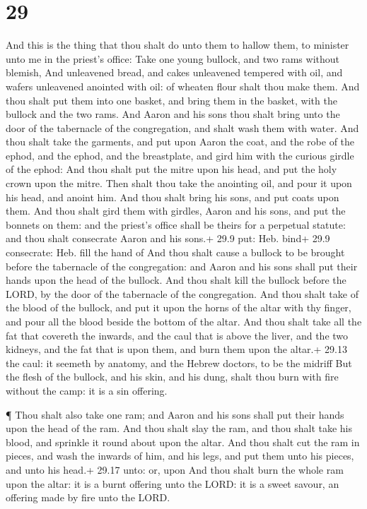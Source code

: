 \hypertarget{section-28}{%
\section{29}\label{section-28}}

 And this is the thing that thou shalt do unto them to
hallow them, to minister unto me in the priest's office: Take one young
bullock, and two rams without blemish,  And unleavened
bread, and cakes unleavened tempered with oil, and wafers unleavened
anointed with oil: of wheaten flour shalt thou make them. 
And thou shalt put them into one basket, and bring them in the basket,
with the bullock and the two rams.  And Aaron and his sons
thou shalt bring unto the door of the tabernacle of the congregation,
and shalt wash them with water.  And thou shalt take the
garments, and put upon Aaron the coat, and the robe of the ephod, and
the ephod, and the breastplate, and gird him with the curious girdle of
the ephod:  And thou shalt put the mitre upon his head, and
put the holy crown upon the mitre.  Then shalt thou take the
anointing oil, and pour it upon his head, and anoint him. 
And thou shalt bring his sons, and put coats upon them.  And
thou shalt gird them with girdles, Aaron and his sons, and put the
bonnets on them: and the priest's office shall be theirs for a perpetual
statute: and thou shalt consecrate Aaron and his sons.+ 29.9 put: Heb.
bind+ 29.9 consecrate: Heb. fill the hand of  And thou
shalt cause a bullock to be brought before the tabernacle of the
congregation: and Aaron and his sons shall put their hands upon the head
of the bullock.  And thou shalt kill the bullock before the
LORD, by the door of the tabernacle of the congregation. 
And thou shalt take of the blood of the bullock, and put it upon the
horns of the altar with thy finger, and pour all the blood beside the
bottom of the altar.  And thou shalt take all the fat that
covereth the inwards, and the caul that is above the liver, and the two
kidneys, and the fat that is upon them, and burn them upon the altar.+
29.13 the caul: it seemeth by anatomy, and the Hebrew doctors, to be the
midriff  But the flesh of the bullock, and his skin, and
his dung, shalt thou burn with fire without the camp: it is a sin
offering.

 ¶ Thou shalt also take one ram; and Aaron and his sons
shall put their hands upon the head of the ram.  And thou
shalt slay the ram, and thou shalt take his blood, and sprinkle it round
about upon the altar.  And thou shalt cut the ram in
pieces, and wash the inwards of him, and his legs, and put them unto his
pieces, and unto his head.+ 29.17 unto: or, upon  And thou
shalt burn the whole ram upon the altar: it is a burnt offering unto the
LORD: it is a sweet savour, an offering made by fire unto the LORD.

